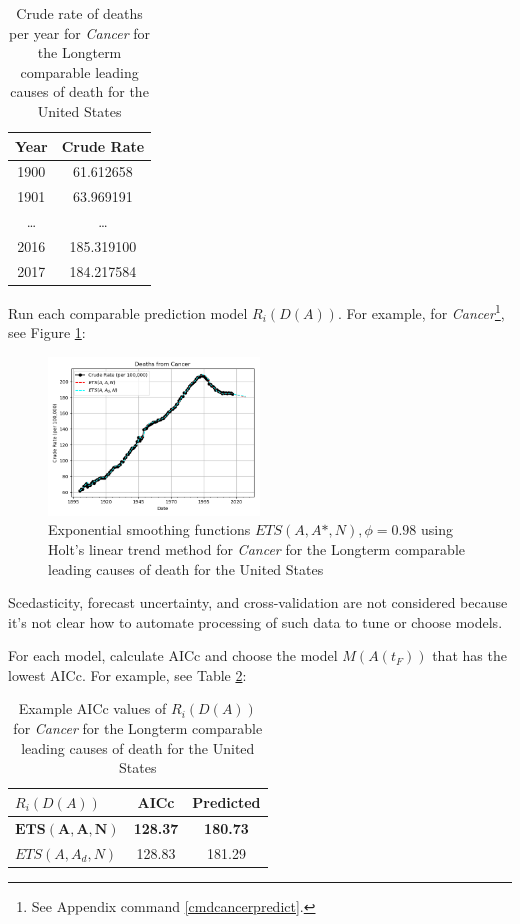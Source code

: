 \documentclass[10pt, a4paper, twocolumn]{IEEEconf}
\begin{document}
\begin{table}[H]
  \centering
  \begin{tabular}{cc}
    \toprule
      Year   & Crude Rate \\
    \midrule
      1900   &  61.612658 \\
      1901   &  63.969191 \\
      \ldots &     \ldots \\
      2016   & 185.319100 \\
      2017   & 184.217584 \\
    \bottomrule
  \end{tabular}
  \caption{Crude rate of deaths per year for \textit{Cancer} for the Longterm comparable leading causes of death for the United States}
  \label{table:daa1}
\end{table}

\clearpage

Run each comparable prediction model $R_i(D(A))$.
For example, for \textit{Cancer}\footnote{See Appendix command \ref{cmdcancerpredict}.}, see Figure \ref{fig:fig1}:

\begin{figure}[H]
  \centering
  \includegraphics[width=0.5\textwidth]{results/US_ICD_LONGTERM_COMPARABLE_LEADING_Cancer_ets.png}
  \caption{Exponential smoothing functions $ETS(A,A*,N),\phi=0.98$ using Holt's linear trend method for \textit{Cancer} for the Longterm comparable leading causes of death for the United States}\label{fig:fig1}
\end{figure}

Scedasticity, forecast uncertainty, and cross-validation are not considered because it's not clear how to automate processing of such data to tune or choose models.

For each model, calculate AICc and choose the model $M(A(t_F))$ that has the lowest AICc.
For example, see Table \ref{table:choosem}:

\begin{table}[H]
  \centering
  \begin{tabular}{lcc}
    \toprule
      $R_i(D(A))$       & AICc            & Predicted       \\
    \midrule
      $\bm{ETS(A,A,N)}$ & \textbf{128.37} & \textbf{180.73} \\
      $ETS(A,A_d,N)$    & 128.83          & 181.29          \\
    \bottomrule
  \end{tabular}
  \caption{Example AICc values of $R_i(D(A))$ for \textit{Cancer} for the Longterm comparable leading causes of death for the United States}
  \label{table:choosem}
\end{table}
\end{document}
